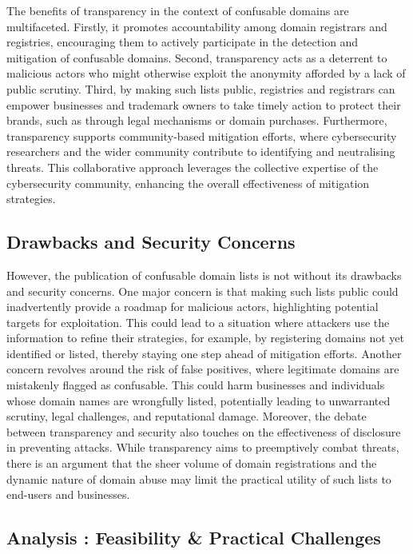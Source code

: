 The benefits of transparency in the context of confusable domains are multifaceted. Firstly, it promotes accountability among domain registrars and registries, encouraging them to actively participate in the detection and mitigation of confusable domains. Second, transparency acts as a deterrent to malicious actors who might otherwise exploit the anonymity afforded by a lack of public scrutiny. Third, by making such lists public, registries and registrars can empower businesses and trademark owners to take timely action to protect their brands, such as through legal mechanisms or domain purchases. Furthermore, transparency supports community-based mitigation efforts, where cybersecurity researchers and the wider community contribute to identifying and neutralising threats. This collaborative approach leverages the collective expertise of the cybersecurity community, enhancing the overall effectiveness of mitigation strategies.

\subsection{Drawbacks and Security Concerns} 

However, the publication of confusable domain lists is not without its drawbacks and security concerns. One major concern is that making such lists public could inadvertently provide a roadmap for malicious actors, highlighting potential targets for exploitation. This could lead to a situation where attackers use the information to refine their strategies, for example, by registering domains not yet identified or listed, thereby staying one step ahead of mitigation efforts. Another concern revolves around the risk of false positives, where legitimate domains are mistakenly flagged as confusable. This could harm businesses and individuals whose domain names are wrongfully listed, potentially leading to unwarranted scrutiny, legal challenges, and reputational damage. Moreover, the debate between transparency and security also touches on the effectiveness of disclosure in preventing attacks. While transparency aims to preemptively combat threats, there is an argument that the sheer volume of domain registrations and the dynamic nature of domain abuse may limit the practical utility of such lists to end-users and businesses.

\subsection{ Analysis : Feasibility \& Practical Challenges}

